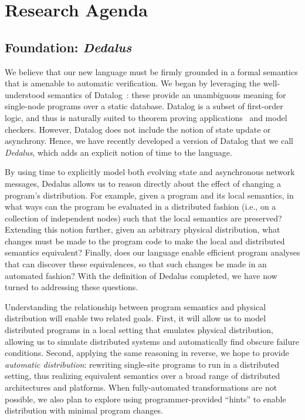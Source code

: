 \section{Research Agenda}

\subsection{Foundation: \emph{Dedalus}}
We believe that our new language must be firmly grounded in a formal semantics
that is amenable to automatic verification. We began by leveraging the
well-understood semantics of Datalog~\cite{ullmanbook}: these provide an
unambiguous meaning for single-node programs over a static database.  Datalog is
a subset of first-order logic, and thus is naturally suited to theorem proving
applications~\cite{verification} and model checkers. However, Datalog does not
include the notion of state update or asynchrony. Hence, we have recently
developed a version of Datalog that we call \emph{Dedalus}, which adds an
explicit notion of time to the language\cite{dedalus-tr}.


By using time to explicitly model both evolving state and asynchronous network
messages, Dedalus allows us to reason directly about the effect of changing a
program's distribution.  For example, given a program and its local semantics,
in what ways can the program be evaluated in a distributed fashion (i.e., on a
collection of independent nodes) such that the local semantics are preserved?
Extending this notion further, given an arbitrary physical distribution, what
changes must be made to the program code to make the local and distributed
semantics equivalent?  Finally, does our language enable efficient program
analyses that can discover these equivalences, so that such changes be made in
an automated fashion? With the definition of Dedalus completed, we have now
turned to addressing these questions.

Understanding the relationship between program semantics and physical
distribution will enable two related goals.  First, it will allow us to model
distributed programs in a local setting that emulates physical distribution,
allowing us to simulate distributed systems and automatically find obscure
failure conditions. Second, applying the same reasoning in reverse, we hope to
provide \emph{automatic distribution}: rewriting single-site programs to run in
a distributed setting, thus realizing equivalent semantics over a broad range of
distributed architectures and platforms.  When fully-automated transformations
are not possible, we also plan to explore using programmer-provided ``hints'' to
enable distribution with minimal program changes.

